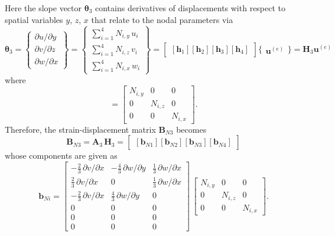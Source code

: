 Here the slope vector $\boldsymbol{\theta}_3$ contains derivatives of displacements with respect to spatial variables $y$, $z$, $x$ that relate to the nodal parameters via
\small
\begin{equation}
\boldsymbol{\theta}_3 =  \begin{Bmatrix}
\partial u / \partial y\\
\partial v / \partial z \\
\partial w / \partial x
\end{Bmatrix}
= \begin{Bmatrix}
\sum\nolimits_{i=1}^4 N_{i,y} \, u_i\\
\sum\nolimits_{i=1}^4 N_{i,z} \, v_i \\
\sum\nolimits_{i=1}^4 N_{i,x} \, w_i
\end{Bmatrix} 
= \begin{bmatrix}
[\mathbf{h}_1] [\mathbf{h}_2] [\mathbf{h}_3] [\mathbf{h}_4] 
\end{bmatrix} \bigl\{ \begin{matrix} \mathbf{u}^{(e)} \end{matrix} \bigr\}
= \mathbf{H}_3 \mathbf{u}^{(e)}
\end{equation}
\normalsize
where 
\begin{equation}
[\mathbf{h}_i] = \begin{bmatrix}
N_{i,y} &  0 & 0  \\
0 & N_{i,z} & 0  \\
0 & 0 & N_{i,x} \end{bmatrix}. 
\end{equation}
Therefore, the strain-displacement matrix $\mathbf{B}_{N3}$ becomes
\begin{equation}
\mathbf{B}_{N3} = \mathbf{A}_3 \, \mathbf{H}_3 = \begin{bmatrix}
[\mathbf{b}_{N1}] [\mathbf{b}_{N2}] [\mathbf{b}_{N3}] [\mathbf{b}_{N4}]
\end{bmatrix} 
\end{equation}
whose components are given as
\begin{equation}
\mathbf{b}_{Ni} = \begin{bmatrix}
	- \tfrac{2}{3} \, \partial v / \partial x &  - \tfrac{4}{3} \, \partial w / \partial y &  \tfrac{1}{3} \, \partial w / \partial x   \\
	\tfrac{2}{3} \, \partial v / \partial x &  0 & \tfrac{1}{3} \, \partial w / \partial x  \\
	- \tfrac{2}{3} \, \partial v / \partial x & \tfrac{4}{3} \, \partial w / \partial y & 0 \\
	0 &  0 & 0  \\
	0 &  0 & 0  \\
	0 &  0 & 0  \end{bmatrix} \, \begin{bmatrix}
N_{i,y} &  0 & 0  \\
0 & N_{i,z} & 0  \\
0 & 0 & N_{i,x}  \end{bmatrix}.
\end{equation}

